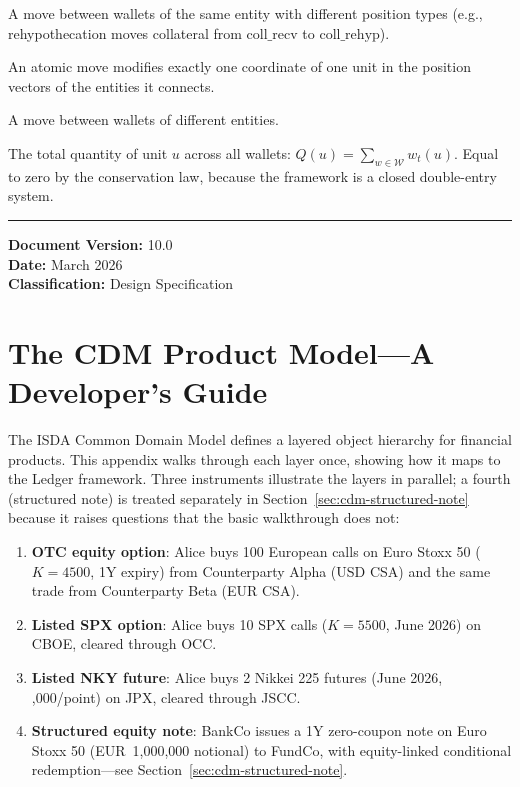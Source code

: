 \documentclass[11pt,a4paper]{article}
\begin{document}
\begin{description}[style=nextline]
\item[Reclassification] A move between wallets of the same entity with different position types (e.g., rehypothecation moves collateral from $\mathrm{coll\_recv}$ to $\mathrm{coll\_rehyp}$).
\item[Single-Coordinate Move Principle] An atomic move modifies exactly one coordinate of one unit in the position vectors of the entities it connects.
\item[Transfer] A move between wallets of different entities.
\item[$Q(u)$] The total quantity of unit $u$ across all wallets: $Q(u) = \sum_{w \in \mathcal{W}} w_t(u)$. Equal to zero by the conservation law, because the framework is a closed double-entry system.
\end{description}

\vspace{2em}
\noindent\rule{\textwidth}{0.4pt}

\noindent\textbf{Document Version:} 10.0\\
\textbf{Date:} March 2026\\
\textbf{Classification:} Design Specification

\clearpage
\section{The CDM Product Model---A Developer's Guide}
\label{app:cdm-walkthrough}

The ISDA Common Domain Model defines a layered object hierarchy for financial products. This appendix walks through each layer once, showing how it maps to the Ledger framework. Three instruments illustrate the layers in parallel; a fourth (structured note) is treated separately in Section~\ref{sec:cdm-structured-note} because it raises questions that the basic walkthrough does not:

\begin{enumerate}[nosep]
\item \textbf{OTC equity option}: Alice buys 100 European calls on Euro Stoxx 50 ($K = 4500$, 1Y expiry) from Counterparty Alpha (USD CSA) and the same trade from Counterparty Beta (EUR CSA).
\item \textbf{Listed SPX option}: Alice buys 10 SPX calls ($K = 5500$, June 2026) on CBOE, cleared through OCC.
\item \textbf{Listed NKY future}: Alice buys 2 Nikkei 225 futures (June 2026, ,000/point) on JPX, cleared through JSCC.
\item \textbf{Structured equity note}: BankCo issues a 1Y zero-coupon note on Euro Stoxx 50 (EUR~1,000,000 notional) to FundCo, with equity-linked conditional redemption---see Section~\ref{sec:cdm-structured-note}.
\end{enumerate}
\end{document}
